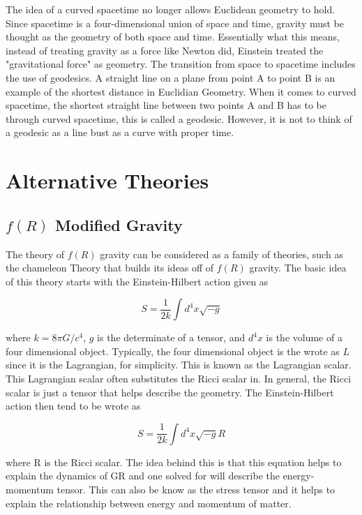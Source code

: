 \documentclass[a4paper]{article}
\begin{document}
The idea of a curved spacetime no longer allows Euclidean geometry to hold. Since spacetime is a four-dimensional union of space and time, gravity must be thought as the geometry of both space and time. Essentially what this means, instead of treating gravity as a force like Newton did, Einstein treated the "gravitational force" as geometry. The transition from space to spacetime includes the use of geodesics. A straight line on a plane from point A to point B is an example of the shortest distance in Euclidian Geometry. When it comes to curved spacetime, the shortest straight line between two points A and B has to be through curved spacetime, this is called a geodesic. However, it is not to think of a geodesic as a line bust as a curve with proper time.



\section{Alternative Theories}

\subsection{$f(R)$ Modified Gravity}

The theory of $f(R)$ gravity can be considered as a family of theories, such as the chameleon Theory that builds its ideas off of $f(R)$ gravity. The basic idea of this theory starts with the Einstein-Hilbert action given as 

$$
S = \frac{1}{2k}\int d^{4}x\sqrt{-g}
$$

where $k = 8\pi G/c^{4}$, $g$ is the determinate of a tensor, and $d^{4}x$ is the volume of a four dimensional object. Typically, the four dimensional object is the wrote as $L$ since it is the Lagrangian, for simplicity. This is known as the Lagrangian scalar. This Lagrangian scalar often substitutes the Ricci scalar in. In general, the Ricci scalar is just a tensor that helps describe the geometry. The Einstein-Hilbert action then tend to be wrote as

$$
S = \frac{1}{2k}\int d^{4}x\sqrt{-g}R
$$

where R is the Ricci scalar. The idea behind this is that this equation helps to explain the dynamics of GR and one solved for will describe the energy-momentum tensor. This can also be know as the stress tensor and it helps to explain the relationship between energy and momentum of matter.
\end{document}
